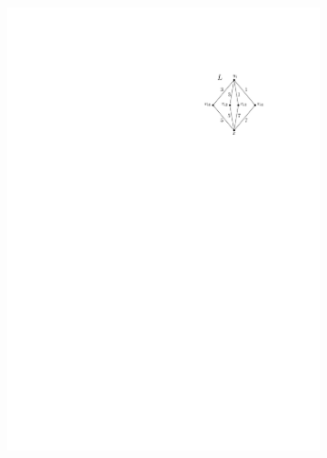 \documentclass[runningheads]{llncs}
\begin{document}
\begin{figure}[htpb]
\begin{subfigure}[b]{0.32\textwidth}
         \includegraphics[scale=1]{img/act-hamilton-cycle-b-simplified}
         \label{fig:act-hamilton-cycle-b}
     \end{subfigure}
     \hfill
     \begin{subfigure}[b]{0.15\textwidth}
         \centering

\end{subfigure}
\end{figure}
\end{document}
